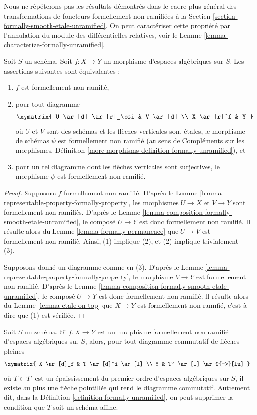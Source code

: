 \noindent
Nous ne répéterons pas les résultats démontrés dans le cadre plus général des
transformations de foncteurs formellement non ramifiées à la
Section \ref{section-formally-smooth-etale-unramified}.
On peut caractériser cette propriété par l'annulation du
module des différentielles relatives, voir le
Lemme \ref{lemma-characterize-formally-unramified}.

\begin{lemma}
\label{lemma-formally-unramified}
Soit $S$ un schéma. Soit $f : X \to Y$ un morphisme d'espaces algébriques sur
$S$. Les assertions suivantes sont équivalentes :
\begin{enumerate}
\item $f$ est formellement non ramifié,
\item pour tout diagramme
$$
\xymatrix{
U \ar[d] \ar[r]_\psi & V \ar[d] \\
X \ar[r]^f & Y
}
$$
où $U$ et $V$ sont des schémas et les flèches verticales sont étales,
le morphisme de schémas $\psi$ est formellement non ramifié (au sens de
Compléments sur les morphismes,
Définition \ref{more-morphisms-definition-formally-unramified}), et
\item pour un tel diagramme dont les flèches verticales sont surjectives, le morphisme
$\psi$ est formellement non ramifié.
\end{enumerate}
\end{lemma}

\begin{proof}
Supposons $f$ formellement non ramifié. D'après le
Lemme \ref{lemma-representable-property-formally-property},
les morphismes $U \to X$ et $V \to Y$ sont formellement non ramifiés. D'après le
Lemme \ref{lemma-composition-formally-smooth-etale-unramified},
le composé $U \to Y$ est donc formellement non ramifié. Il résulte alors du
Lemme \ref{lemma-formally-permanence}
que $U \to V$ est formellement non ramifié. Ainsi, (1) implique (2), et (2)
implique trivialement (3).

\medskip\noindent
Supposons donné un diagramme comme en (3). D'après le
Lemme \ref{lemma-representable-property-formally-property},
le morphisme $V \to Y$ est formellement non ramifié. D'après le
Lemme \ref{lemma-composition-formally-smooth-etale-unramified},
le composé $U \to Y$ est donc formellement non ramifié. Il résulte alors du
Lemme \ref{lemma-etale-on-top}
que $X \to Y$ est formellement non ramifié, c'est-à-dire que (1) est vérifiée.
\end{proof}

\begin{lemma}
\label{lemma-formally-unramified-not-affine}
Soit $S$ un schéma.
Si $f : X \to Y$ est un morphisme formellement non ramifié d'espaces algébriques
sur $S$, alors, pour tout diagramme commutatif de flèches pleines
$$
\xymatrix{
X \ar[d]_f & T \ar[d]^i \ar[l] \\
Y & T' \ar[l] \ar@{-->}[lu]
}
$$
où $T \subset T'$ est un épaississement du premier ordre d'espaces algébriques
sur $S$, il existe au plus une flèche pointillée qui rend le diagramme commutatif.
Autrement dit, dans la
Définition \ref{definition-formally-unramified},
on peut supprimer la condition que $T$ soit un schéma affine.
\end{lemma}

